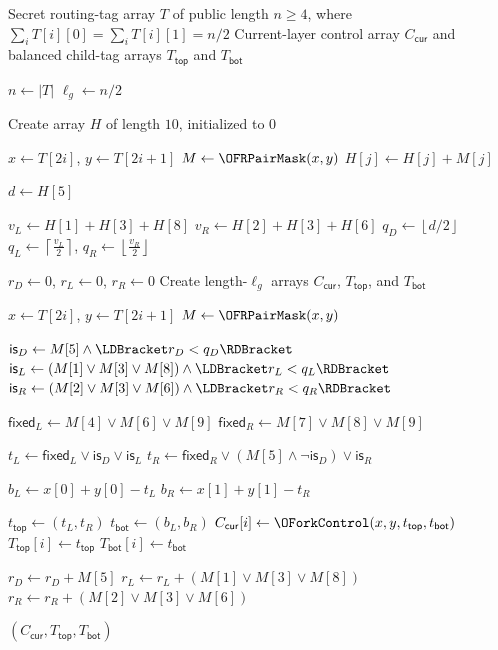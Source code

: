 \begin{algorithm}[t]
\caption{$\OFRBalance(T)$}
\label{alg:ofr-balance-layer}
\begin{algorithmic}[1]
\Require Secret routing-tag array $T$ of public length $n\geq 4$,
where $\sum_i T[i][0]=\sum_i T[i][1]=n/2$
\Ensure Current-layer control array $C_{\mathsf{cur}}$ and balanced child-tag arrays
$T_{\mathsf{top}}$ and $T_{\mathsf{bot}}$

\State $n \gets |T|$
\State $\ell_g \gets n/2$

\State Create array $H$ of length $10$, initialized to $0$

    \State $x \gets T[2i]$, $y \gets T[2i+1]$
    \State $M \gets \OFRPairMask(x,y)$
        \State $H[j] \gets H[j]+M[j]$
    \EndFor
\EndFor

\State $d \gets H[5]$

\State $v_L \gets H[1]+H[3]+H[8]$
\State $v_R \gets H[2]+H[3]+H[6]$
\State $q_D \gets \left\lfloor d/2\right\rfloor$
\State $q_L \gets \left\lceil  \frac{v_L}{2} \right\rceil$,
       $q_R \gets \left\lfloor \frac{v_R}{2} \right\rfloor$

\State $r_D \gets 0$, $r_L \gets 0$,
       $r_R \gets 0$
\State Create length-$\ell_g$ arrays $C_{\mathsf{cur}}$, $T_{\mathsf{top}}$, and
       $T_{\mathsf{bot}}$

    \State $x \gets T[2i]$, $y \gets T[2i+1]$
    \State $M \gets \OFRPairMask(x,y)$

    \State $\mathsf{is}_D \gets
           M[5]\land\LDBracket r_D<q_D\RDBracket$
    \State $\mathsf{is}_L \gets
           (M[1]\lor M[3]\lor M[8])
           \land\LDBracket r_L<q_L\RDBracket$
    \State $\mathsf{is}_R \gets
           (M[2]\lor M[3]\lor M[6])
           \land\LDBracket r_R<q_R\RDBracket$

    \State $\mathsf{fixed}_L \gets M[4]\lor M[6]\lor M[9]$
    \State $\mathsf{fixed}_R \gets M[7]\lor M[8]\lor M[9]$

    \State $t_L \gets
           \mathsf{fixed}_L\lor\mathsf{is}_D\lor\mathsf{is}_L$
    \State $t_R \gets
           \mathsf{fixed}_R
           \lor(M[5]\land\neg\mathsf{is}_D)
           \lor\mathsf{is}_R$

    \State $b_L \gets x[0]+y[0]-t_L$
    \State $b_R \gets x[1]+y[1]-t_R$

    \State $t_{\mathsf{top}} \gets (t_L,t_R)$
    \State $t_{\mathsf{bot}} \gets (b_L,b_R)$
    \State $C_{\mathsf{cur}}[i] \gets
           \OForkControl(x,y,t_{\mathsf{top}},t_{\mathsf{bot}})$
    \State $T_{\mathsf{top}}[i] \gets t_{\mathsf{top}}$
    \State $T_{\mathsf{bot}}[i] \gets t_{\mathsf{bot}}$

    \State $r_D \gets r_D+M[5]$
    \State $r_L \gets r_L+(M[1]\lor M[3]\lor M[8])$
    \State $r_R \gets r_R+(M[2]\lor M[3]\lor M[6])$
\EndFor

\State \Return $(C_{\mathsf{cur}},T_{\mathsf{top}},T_{\mathsf{bot}})$
\end{algorithmic}
\end{algorithm}


